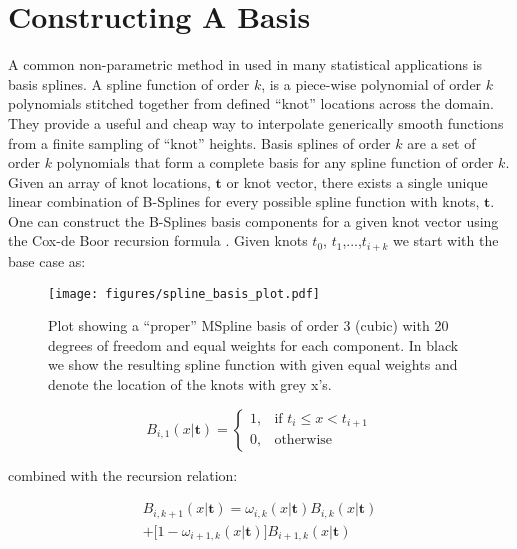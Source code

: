\section{Constructing A Basis} \label{sec:basis_splines}

A common non-parametric method in used in many statistical applications is basis splines. A spline function of order $k$, 
is a piece-wise polynomial of order $k$ polynomials stitched together from defined ``knot'' locations across the domain. 
They provide a useful and cheap way to interpolate generically smooth functions from a finite sampling of ``knot'' heights. 
Basis splines of order $k$ are a set of order $k$ polynomials that form a complete basis for any spline function of order $k$. 
Given an array of knot locations, $\mathbf{t}$ or knot vector, there exists a single unique linear combination of B-Splines for 
every possible spline function with knots, $\mathbf{t}$. One can construct the B-Splines basis components for a given knot vector 
using the Cox-de Boor recursion formula \cite{deBoor78}. Given knots $t_0$, $t_1$,...,$t_{i+k}$ we start with the base case as:

\begin{figure}[ht!]
    \begin{centering}
        \texttt{[image: figures/spline\_basis\_plot.pdf]}
        \caption{Plot showing a ``proper'' MSpline basis of order 3 (cubic) with 20 degrees of freedom and equal weights for each component. 
        In black we show the resulting spline function with given equal weights and denote the location of the knots with grey x's.}
        \label{fig:spline_basis}
    \end{centering}
\end{figure}

\begin{equation}
    B_{i,1}(x | \mathbf{t}) = 
    \begin{cases}
        1, & \text{if } t_i \leq x < t_{i+1} \\
        0, & \text{otherwise}
    \end{cases}
\end{equation}

\noindent combined with the recursion relation:

\begin{multline*}
    B_{i,k+1}(x | \mathbf{t}) = \omega_{i,k}(x | \mathbf{t})B_{i,k}(x | \mathbf{t})\\
                                + \big[1-\omega_{i+1,k}(x | \mathbf{t})\big] B_{i+1,k}(x | \mathbf{t})
\end{multline*}

